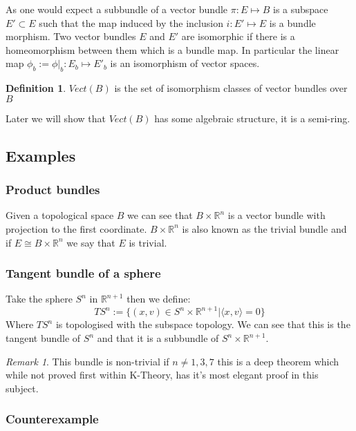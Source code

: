 \documentclass[a4paper,10pt]{article}
\theoremstyle{plain}%
\theoremstyle{definition}
\newtheorem{defn}{Definition}
\theoremstyle{remark}
\newtheorem{rem}{Remark}
\newcommand{\RR}{\mathbb{R}}
\begin{document}
As one would expect a subbundle of a vector bundle $\pi:E\mapsto B$ is a subspace $E'\subset E$
such that the map induced by the inclusion $i:E'\mapsto E$ is a bundle morphism. Two 
vector bundles $E$ and $E'$ are isomorphic if there is a homeomorphism between them which is a bundle map.
In particular the linear map $\phi_b:=\phi|_b :E_b \mapsto E'_b$ is an isomorphism of vector spaces.

\begin{defn}
  $Vect(B)$ is the set of isomorphism classes of vector bundles over $B$ 
\end{defn}

Later we will show that $Vect(B)$ has some algebraic structure, it is a semi-ring.

\subsection{Examples}

\subsubsection{Product bundles}

Given a topological space $B$ we can see that $B\times \RR^n$ is a vector bundle with projection to
the first coordinate. $B \times\RR^n$ is also known as the trivial bundle and if $E\cong B\times \RR^n$ 
we say that $E$ is trivial.

\subsubsection{Tangent bundle of a sphere}

Take the sphere $S^n$ in $\RR^{n+1}$ then we define:
$$TS^n:=\{(x,v) \in S^n\times \RR^{n+1} | \langle x,v \rangle =0\} $$
Where $TS^n$ is topologised with the subspace topology.
We can see that this is the tangent bundle of $S^n$ and that it is a subbundle of $S^n\times \RR^{n+1}$.

\begin{rem}
 This bundle is non-trivial if $n\neq 1,3,7$ this is a deep theorem which while not proved first within 
K-Theory, has it's most elegant proof in this subject.
\end{rem}


\subsubsection{Counterexample}
\end{document}
